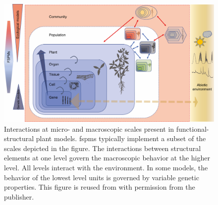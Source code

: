 \begin{figure}[t]
	\centering
	\includegraphics[width=\textwidth]{img/fspm_scales_louarn_2020.jpeg}
	
	\caption[Interactions at micro- and macroscopic scales present in functional-structural plant models (from \citet{louarn_two_2020}).]{
	        Interactions at micro- and macroscopic scales present in functional-structural plant models.
    	    \acrshort{fspm}s typically implement a subset of the scales depicted in the figure. The interactions between structural elements at one level govern the macroscopic behavior at the higher level. All levels interact with the environment. In some models, the behavior of the lowest level units is governed by variable genetic properties. This figure is reused from \citet{louarn_two_2020} with permission from the publisher.
        }
	\label{fig:fspm_scales_louarn2020}
\end{figure}



